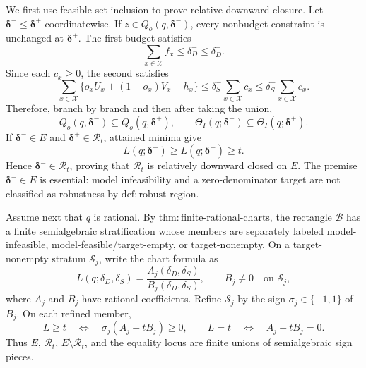 We first use feasible-set inclusion to prove relative downward closure.  Let \(\boldsymbol\delta^-\leq\boldsymbol\delta^+\) coordinatewise.  If \(z\in Q_o(q,\boldsymbol\delta^-)\), every nonbudget constraint is unchanged at \(\boldsymbol\delta^+\).  The first budget satisfies
\[
 \sum_{x\in\mathcal X}f_x
 \leq\delta_D^-
 \leq\delta_D^+.
\]
Since each \(c_x\geq0\), the second satisfies
\[
 \sum_{x\in\mathcal X}\{o_xU_x+(1-o_x)V_x-h_x\}
 \leq\delta_S^-\sum_{x\in\mathcal X}c_x
 \leq\delta_S^+\sum_{x\in\mathcal X}c_x.
\]
Therefore, branch by branch and then after taking the union,
\[
 Q_o(q,\boldsymbol\delta^-)
 \subseteq Q_o(q,\boldsymbol\delta^+),
 \qquad
 \Theta_I(q;\boldsymbol\delta^-)
 \subseteq\Theta_I(q;\boldsymbol\delta^+).
\]
If \(\boldsymbol\delta^-\in E\) and \(\boldsymbol\delta^+\in\mathcal R_t\), attained minima give
\[
 L(q;\boldsymbol\delta^-)
 \geq L(q;\boldsymbol\delta^+)
 \geq t.
\]
Hence \(\boldsymbol\delta^-\in\mathcal R_t\), proving that \(\mathcal R_t\) is relatively downward closed on \(E\).  The premise \(\boldsymbol\delta^-\in E\) is essential: model infeasibility and a zero-denominator target are not classified as robustness by \(\mathrm{def:robust\text{-}region}\).

Assume next that \(q\) is rational.  By \(\mathrm{thm:finite\text{-}rational\text{-}charts}\), the rectangle \(\mathcal B\) has a finite semialgebraic stratification whose members are separately labeled model-infeasible, model-feasible/target-empty, or target-nonempty.  On a target-nonempty stratum \(\mathcal S_j\), write the chart formula as
\[
 L(q;\delta_D,\delta_S)
 =\frac{A_j(\delta_D,\delta_S)}{B_j(\delta_D,\delta_S)},
 \qquad B_j\neq0\quad\text{on }\mathcal S_j,
\]
where \(A_j\) and \(B_j\) have rational coefficients.  Refine \(\mathcal S_j\) by the sign \(\sigma_j\in\{-1,1\}\) of \(B_j\).  On each refined member,
\[
 L\geq t
 \quad\Longleftrightarrow\quad
 \sigma_j(A_j-tB_j)\geq0,
 \qquad
 L=t
 \quad\Longleftrightarrow\quad
 A_j-tB_j=0.
\]
Thus \(E\), \(\mathcal R_t\), \(E\setminus\mathcal R_t\), and the equality locus are finite unions of semialgebraic sign pieces.

